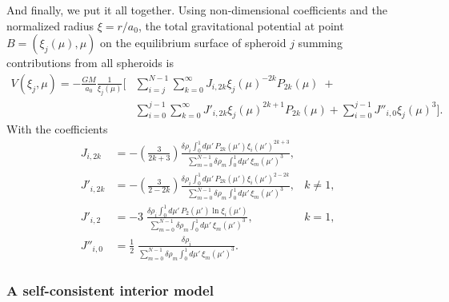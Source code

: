 \documentclass[amsmath,amsfonts,rmp,letterpaper]{revtex4}
\renewcommand{\inf}{\infty}
\newcommand{\ptk}{P_{2k}}
\newcommand{\sumonk}{\sum_{k=0}^{\inf}}
\newcommand{\dro}{\delta\rho}
\newcommand{\mupint}{\int_{0}^{1}d\mu'\,}
\begin{document}
And finally, we put it all together. Using non-dimensional coefficients and the
normalized radius $\xi=r/a_0$, the total gravitational potential at point
$B=(\xi_j(\mu),\mu)$ on the equilibrium surface of spheroid $j$ summing
contributions from all spheroids is
\begin{equation}\label{eq:VatB}
\begin{split}
V(\xi_j,\mu) = 
-\frac{GM}{a_0}\frac{1}{\xi_j(\mu)}\Biggl[
&\sum_{i=j}^{N-1}\sumonk{}J_{i,2k}\xi_j(\mu)^{-2k}\ptk(\mu)\; + \\
& \sum_{i=0}^{j-1}\sumonk{}J'_{i,2k}\xi_j(\mu)^{2k+1}\ptk(\mu) + 
  \sum_{i=0}^{j-1} J''_{i,0}\xi_j(\mu)^3
\Biggr].
\end{split}
\end{equation}
With the coefficients
\begin{subequations}\label{eq:J_menagerie}
\begin{align}
J_{i,2k} &= -\left(\frac{3}{2k + 3}\right)
\frac{\dro_i\mupint\ptk(\mu')\xi_i(\mu')^{2k + 3}}
{\sum_{m=0}^{N-1}\dro_m\mupint\xi_m(\mu')^3},\\
J'_{i,2k} &= -\left(\frac{3}{2 - 2k}\right)
\frac{\dro_i\mupint\ptk(\mu')\xi_i(\mu')^{2 - 2k}}
{\sum_{m=0}^{N-1}\dro_m\mupint\xi_m(\mu')^3}, & k\ne{1},\\
J'_{i,2} &= -3\;
\frac{\dro_i\mupint{}P_2(\mu')\ln{\xi_i(\mu')}}
{\sum_{m=0}^{N-1}\dro_m\mupint\xi_m(\mu')^3}, & k=1,\\
J''_{i,0} &= \frac{1}{2}\;
\frac{\dro_i}{\sum_{m=0}^{N-1}\dro_m\mupint\xi_m(\mu')^3}.
\end{align}
\end{subequations}

\subsubsection{A self-consistent interior model}
\end{document}
